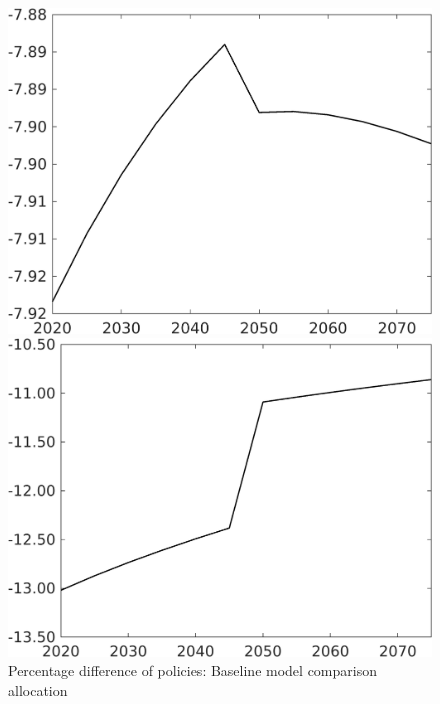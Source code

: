 \documentclass[12pt]{article}
\begin{document}
\begin{figure}[h!!]
	\centering
	\caption{Percentage difference of policies: Baseline model comparison allocation}\label{fig:Pertauf_nsk0_xgr02}
	
	\begin{minipage}[]{0.32\textwidth}
		\includegraphics[width=1\textwidth]{../../codding_model/own_basedOnFried/optimalPol_010922_revision/figures/all_13Sept22/CompTaufPER_bytaul_Reg0_N_spillover0_nsk0_xgr0_knspil0_sep0_LFlimit1_emsbase0_countec0_GovRev0_etaa0.79_lgd0.png}
	\end{minipage}	
\begin{minipage}[]{0.32\textwidth}
\includegraphics[width=1\textwidth]{../../codding_model/own_basedOnFried/optimalPol_010922_revision/figures/all_13Sept22/CompTaufPER_bytaul_Reg0_G_spillover0_nsk0_xgr0_knspil0_sep0_LFlimit1_emsbase0_countec0_GovRev0_etaa0.79_lgd0.png}

\end{minipage}
\end{figure}
\end{document}

